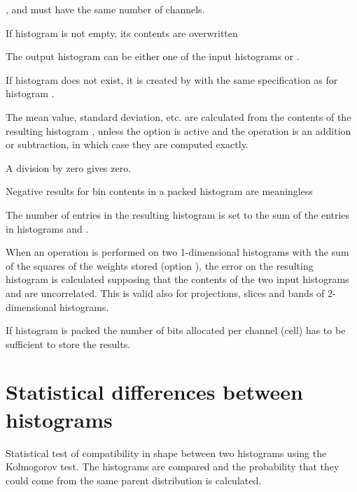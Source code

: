 \Remark
\begin{UL}
\item {},  and 
      must have the same number of channels.
\item If histogram  is not empty, its contents are overwritten
\item The output histogram  can be either one of the input 
      histograms  or .
\item If histogram  does not exist, it is created
      by  with the same specification as for histogram .
\item The mean value, standard deviation, etc. are calculated from the
      contents of the resulting histogram ,
      unless the  option is active and the
      operation is an addition or subtraction, in which case
      they are computed exactly.
\item A division by zero gives zero.
\item Negative results for bin contents in a packed histogram are
      meaningless
\item The number of entries in the resulting histogram  is set
      to the sum of the entries in histograms  and .
\item When an operation is performed on two 1-dimensional histograms with
      the sum of the squares of the weights stored (option ), the
      error on the resulting histogram is calculated
      supposing that the contents of the two input histograms  and
       are uncorrelated.
      This is valid also for projections, slices and
      bands of 2-dimensional histograms.
\item If histogram  is packed the
      number of bits allocated per channel (cell) has to be sufficient
      to store the results.
\end{UL}
 
\newpage
\section{Statistical differences between histograms}
\label{HSTATDIF}

 
\Action
Statistical test of compatibility in shape between
two histograms using the Kolmogorov test.
The histograms are compared and the probability that they
could come from the same parent distribution is calculated.
 
